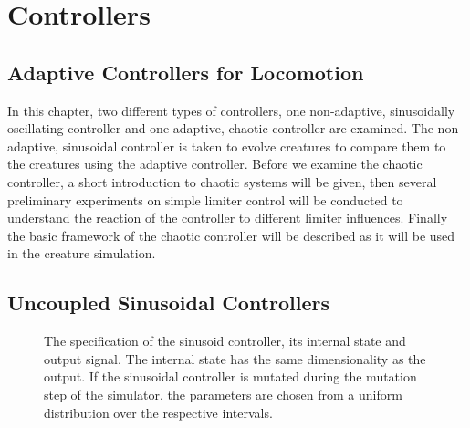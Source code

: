 \documentclass[main]{subfiles}
\begin{document}
\setcounter{chapter}{2}

\chapter{Controllers} %

\label{Chapter\thechapter} %


\section{Adaptive Controllers for Locomotion}

In this chapter, two different types of controllers, one non-adaptive, sinusoidally oscillating controller and one adaptive, chaotic controller are examined. %
%
The non-adaptive, sinusoidal controller is taken to evolve creatures to compare them to the creatures using the adaptive controller. %
%
Before we examine the chaotic controller, a short introduction to chaotic systems will be given, then several preliminary experiments on simple limiter control will be conducted to understand the reaction of the controller to different limiter influences. %
%
Finally the basic framework of the chaotic controller will be described as it will be used in the creature simulation. %

\section{Uncoupled Sinusoidal Controllers}
\label{sec:sinusoidal-controllers}

\begin{figure}[H]
\centering


\caption[The sinusoid controller]{The specification of the sinusoid controller, its internal state and output signal. The internal state has the same dimensionality as the output. If the sinusoidal controller is mutated during the mutation step of the simulator, the parameters are chosen from a uniform distribution over the respective intervals.}
\label{figure:sinusoid-controller}
\end{figure}
\end{document}
